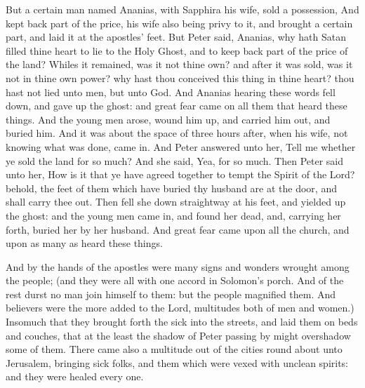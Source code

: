  But a certain man named Ananias, with Sapphira his wife,
sold a possession,  And kept back part of the price, his
wife also being privy to it, and brought a certain part, and laid it at
the apostles' feet.  But Peter said, Ananias, why hath Satan
filled thine heart to lie to the Holy Ghost, and to keep back part of
the price of the land?  Whiles it remained, was it not thine
own? and after it was sold, was it not in thine own power? why hast thou
conceived this thing in thine heart? thou hast not lied unto men, but
unto God.  And Ananias hearing these words fell down, and
gave up the ghost: and great fear came on all them that heard these
things.  And the young men arose, wound him up, and carried
him out, and buried him.  And it was about the space of
three hours after, when his wife, not knowing what was done, came in.
 And Peter answered unto her, Tell me whether ye sold the
land for so much? And she said, Yea, for so much.  Then
Peter said unto her, How is it that ye have agreed together to tempt the
Spirit of the Lord? behold, the feet of them which have buried thy
husband are at the door, and shall carry thee out.  Then
fell she down straightway at his feet, and yielded up the ghost: and the
young men came in, and found her dead, and, carrying her forth, buried
her by her husband.  And great fear came upon all the
church, and upon as many as heard these things.

 And by the hands of the apostles were many signs and
wonders wrought among the people; (and they were all with one accord in
Solomon's porch.  And of the rest durst no man join himself
to them: but the people magnified them.  And believers were
the more added to the Lord, multitudes both of men and women.)
 Insomuch that they brought forth the sick into the
streets, and laid them on beds and couches, that at the least the shadow
of Peter passing by might overshadow some of them.  There
came also a multitude out of the cities round about unto Jerusalem,
bringing sick folks, and them which were vexed with unclean spirits: and
they were healed every one.

